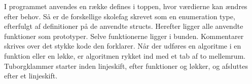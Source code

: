 I programmet anvendes en række defines i toppen, hvor værdierne kan ændres efter behov. Så er de forskellige skolefag skrevet som en enumeration type, efterfulgt af definitioner på de anvendte structs. Herefter ligger alle anvendte funktioner som prototyper. Selve funktionerne ligger i bunden. Kommentarer skrives over det stykke kode den forklarer. Når der udføres en algoritme i en funktion eller en løkke, er algoritmen rykket ind med et tab af to mellemrum. Tuborgklammer starter inden linjeskift, efter funktioner og løkker, og afsluttes efter et linjeskift. 